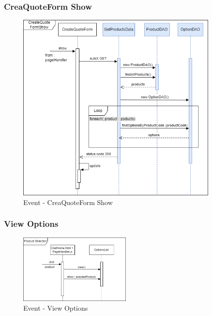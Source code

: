 \documentclass[a4paper, 12pt]{article}
\begin{document}
\subsubsection{CreaQuoteForm Show}
\begin{figure}[h!]
	\centering
	\includegraphics[width=0.9\textwidth]{RIA_images/CreateQuoteFormShow.png}
	\caption{Event - CreaQuoteForm Show}
	\label{figure:CreaQuoteFormShowRIA}
\end{figure}
\subsubsection{View Options}
\begin{figure}[h!]
	\centering
	\includegraphics[width=0.5\textwidth]{RIA_images/ViewOptionsEvent.png}
	\caption{Event - View Options}
	\label{figure:ViewOptionsRIA}
\end{figure}
\newpage
\end{document}
